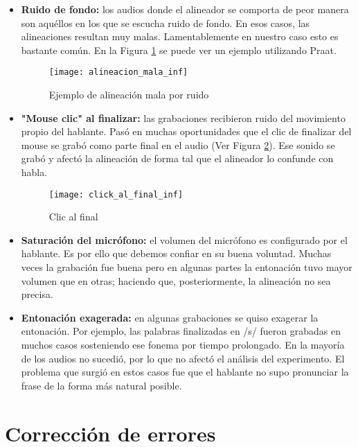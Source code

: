 \begin{itemize}
    \item \textbf{Ruido de fondo:} los audios donde el alineador se comporta de peor manera son aquéllos en los que se escucha ruido de fondo. En esos casos, las alineaciones resultan muy malas. Lamentablemente en nuestro caso esto es bastante común. En la Figura \ref{alinMala} se puede ver un ejemplo utilizando Praat.

\begin{figure}[h!]
    \centerline{\texttt{[image: alineacion\_mala\_inf]} }
    \caption{Ejemplo de alineación mala por ruido}
    \label{alinMala}
\end{figure}

    \item \textbf{"Mouse clic" al finalizar:} las grabaciones recibieron ruido del movimiento propio del hablante. Pasó en muchas oportunidades que el clic de finalizar del mouse se grabó como parte final en el audio (Ver Figura \ref{clickFinal}). Ese sonido se grabó y afectó la alineación de forma tal que el alineador lo confunde con habla.
    
\begin{figure}[h!]
    \centerline{\texttt{[image: click\_al\_final\_inf]} }
    \caption{Clic al final}
    \label{clickFinal}
\end{figure}

    \item \textbf{Saturación del micrófono:} el volumen del micrófono es configurado por el hablante. Es por ello que debemos confiar en su buena voluntad. Muchas veces la grabación fue buena pero en algunas partes la entonación tuvo mayor volumen que en otras; haciendo que, posteriormente, la alineación no sea precisa.
    
    \item \textbf{Entonación exagerada:} en algunas grabaciones se quiso exagerar la entonación. Por ejemplo, las palabras finalizadas en /s/ fueron grabadas en muchos casos sosteniendo ese fonema por tiempo prolongado. En la mayoría de los audios no sucedió, por lo que no afectó el análisis del experimento. El problema que surgió en estos casos fue que el hablante no supo pronunciar la frase de la forma más natural posible. 
    
\end{itemize}

\section{Corrección de errores}

